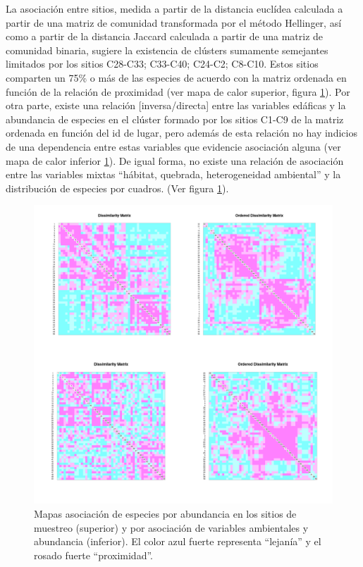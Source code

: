 \documentclass[11pt,]{article}
\begin{document}
La asociación entre sitios, medida a partir de la distancia euclídea
calculada a partir de una matriz de comunidad transformada por el método
Hellinger, así como a partir de la distancia Jaccard calculada a partir
de una matriz de comunidad binaria, sugiere la existencia de clústers
sumamente semejantes limitados por los sitios C28-C33; C33-C40; C24-C2;
C8-C10. Estos sitios comparten un 75\% o más de las especies de acuerdo
con la matriz ordenada en función de la relación de proximidad (ver mapa
de calor superior, figura \ref{fig:heat}). Por otra parte, existe una
relación {[}inversa/directa{]} entre las variables edáficas y la
abundancia de especies en el clúster formado por los sitios C1-C9 de la
matriz ordenada en función del id de lugar, pero además de esta relación
no hay indicios de una dependencia entre estas variables que evidencie
asociación alguna (ver mapa de calor inferior \ref{fig:heat}). De igual
forma, no existe una relación de asociación entre las variables mixtas
``hábitat, quebrada, heterogeneidad ambiental'' y la distribución de
especies por cuadros. (Ver figura \ref{fig:heat}).

\begin{figure}
\centering
\includegraphics[width=1.00000\textwidth]{Analisis/Imagenes manuscrito/Heat_maps_Q.png}
\caption{Mapas asociación de especies por abundancia en los sitios de
muestreo (superior) y por asociación de variables ambientales y
abundancia (inferior). El color azul fuerte representa ``lejanía'' y el
rosado fuerte ``proximidad''.\label{fig:heat}}
\end{figure}
\end{document}
